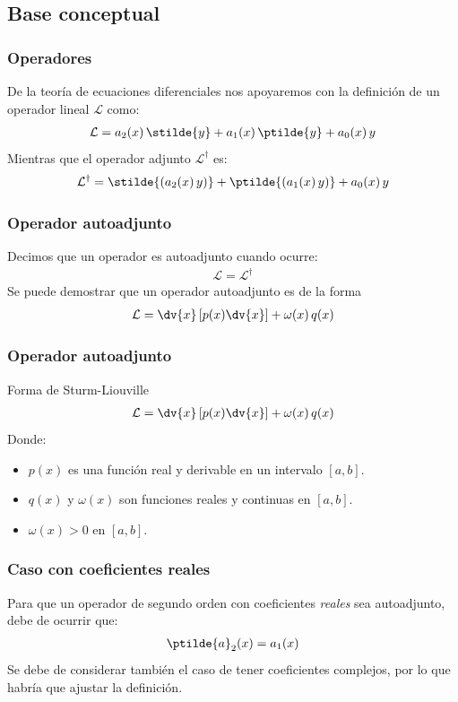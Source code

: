 \subsection{Base conceptual}
\begin{frame}
\frametitle{Operadores}
De la teoría de ecuaciones diferenciales nos apoyaremos con la definición de un operador lineal $\mathcal{L}$ como:
\begin{align*}
\mathcal{L} = a_{2}(x) \, \stilde{y} + a_{1} (x) \, \ptilde{y} + a_{0} (x) \, y
\end{align*}
\pause
Mientras que el operador adjunto $\mathcal{L}^{\dagger}$ es:
\begin{align*}
\mathcal{L}^{\dagger} = \stilde{(a_{2}(x) \, y)} + \ptilde{(a_{1}(x) \, y)} + a_{0}(x) \, y
\end{align*}
\end{frame}
\begin{frame}
\frametitle{Operador autoadjunto}
Decimos que un operador es autoadjunto cuando ocurre:
\begin{align*}
\mathcal{L} = \mathcal{L}^{\dagger}
\end{align*}
\pause
Se puede demostrar que un operador autoadjunto es de la forma
\begin{align*}
\mathcal{L} = \dv{x} \left[ p(x) \dv{x} \right] + \omega (x) \, q(x)
\end{align*}
\end{frame}
\begin{frame}
\frametitle{Operador autoadjunto}
Forma de Sturm-Liouville
\begin{align*}
\mathcal{L} = \dv{x} \left[ p(x) \dv{x} \right] + \omega (x) \, q(x)
\end{align*}
Donde:
\begin{itemize}[<+->]
\item $p(x)$ es una función real y derivable en un intervalo $[a, b]$.
\item $q(x)$ y $\omega (x)$ son funciones reales y continuas en $[a, b]$.
\item $\omega (x) > 0$ en $[a, b]$.
\end{itemize}
\end{frame}
\begin{frame}
\frametitle{Caso con coeficientes reales}
Para que un operador de segundo orden con coeficientes \emph{reales} sea autoadjunto, debe de ocurrir que:
\begin{align*}
\ptilde{a}_{2}(x) = a_{1}(x)
\end{align*}
\pause
Se debe de considerar también el caso de tener coeficientes complejos, por lo que habría que ajustar la definición.
\end{frame}  
